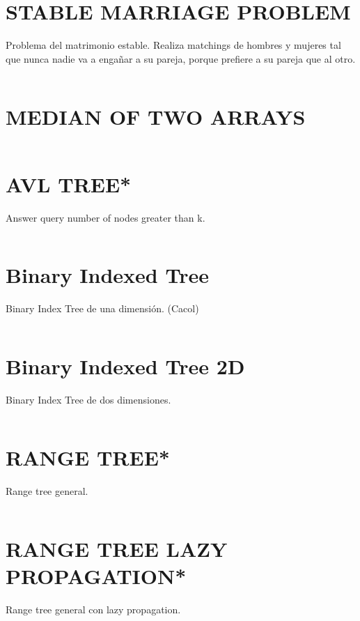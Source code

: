 \documentclass{article}
\begin{document}
\section*{STABLE MARRIAGE PROBLEM}
Problema del matrimonio estable.
Realiza matchings de hombres y mujeres tal que nunca nadie va a enga\~nar a su pareja,
porque prefiere a su pareja que al otro.
\inputminted[]{c++}{algorithms/STABLEMARRIAGE.cpp}
\newpage


\section*{MEDIAN OF TWO ARRAYS}
\inputminted[]{c++}{algorithms/MEDIAN.cpp}
\newpage

\section*{AVL TREE*}
Answer query number of nodes greater than k.
\inputminted[]{c++}{algorithms/AVL.cpp}
\newpage

\section*{Binary Indexed Tree}
Binary Index Tree de una dimensi\'on. (Cacol)
\inputminted[]{c++}{algorithms/BIT1D.cpp}
\newpage

\section*{Binary Indexed Tree 2D}
Binary Index Tree de dos dimensiones.
\inputminted[]{c++}{algorithms/BIT2D.cpp}
\newpage


\section*{RANGE TREE*}
Range tree general.
\inputminted[]{c++}{algorithms/RANGETREE.cpp}
\newpage

\section*{RANGE TREE LAZY PROPAGATION*}
Range tree general con lazy propagation.
\inputminted[]{c++}{algorithms/RANGETREELAZY.cpp}
\newpage

\end{document}
